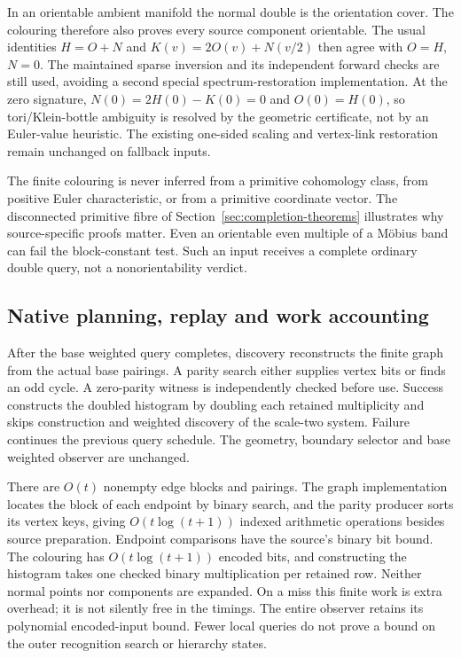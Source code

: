 In an orientable ambient manifold the normal double is the orientation
cover. The colouring therefore also proves every source component
orientable. The usual identities $H=O+N$ and
$K(v)=2O(v)+N(v/2)$ then agree with $O=H$, $N=0$. The maintained sparse
inversion and its independent forward checks are still used, avoiding a
second special spectrum-restoration implementation. At the zero signature,
$N(0)=2H(0)-K(0)=0$ and $O(0)=H(0)$, so tori/Klein-bottle ambiguity is
resolved by the geometric certificate, not by an Euler-value heuristic.
The existing one-sided scaling and vertex-link restoration remain unchanged
on fallback inputs.

The finite colouring is never inferred from a primitive cohomology class,
from positive Euler characteristic, or from a primitive coordinate vector.
The disconnected primitive fibre of
Section~\ref{sec:completion-theorems} illustrates why source-specific
proofs matter. Even an orientable even multiple of a M\"obius band can fail
the block-constant test. Such an input receives a complete ordinary double
query, not a nonorientability verdict.

\subsection{Native planning, replay and work accounting}

After the base weighted query completes, discovery reconstructs the finite
graph from the actual base pairings. A parity search either supplies vertex
bits or finds an odd cycle. A zero-parity witness is independently checked
before use. Success constructs the doubled histogram by doubling each
retained multiplicity and skips construction and weighted discovery of the
scale-two system. Failure continues the previous query schedule. The
geometry, boundary selector and base weighted observer are unchanged.

There are $O(t)$ nonempty edge blocks and pairings. The graph implementation
locates the block of each endpoint by binary search, and the parity producer
sorts its vertex keys, giving $O(t\log(t+1))$ indexed arithmetic operations
besides source preparation. Endpoint comparisons have the source's binary
bit bound. The colouring has $O(t\log(t+1))$ encoded bits, and constructing
the histogram takes one checked binary multiplication per retained row.
Neither normal points nor components are expanded. On a miss this finite
work is extra overhead; it is not silently free in the timings. The entire
observer retains its polynomial encoded-input bound. Fewer local queries
do not prove a bound on the outer recognition search or hierarchy states.

